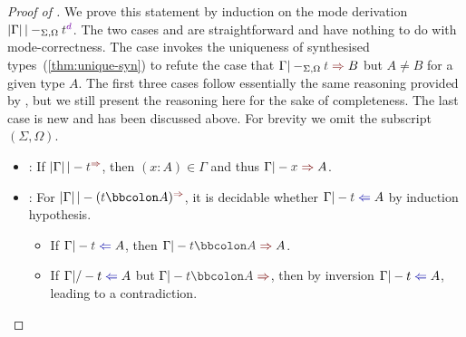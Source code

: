 \begin{proof}[Proof of {}]
  We prove this statement by induction on the mode derivation\/ $\erase{\Gamma} |-_{\Sigma, \Omega} \isTerm{t}^{\dir{d}}$.
  The two cases  and  are straightforward and have nothing to do with mode-correctness.
  The case  invokes the uniqueness of synthesised types~(\cref{thm:unique-syn}) to refute the case that $\Gamma |-_{\Sigma, \Omega} \isTerm{t} \syn B$ but $A \neq B$ for a given type $A$.
  The first three cases follow essentially the same reasoning provided by \citet{Wadler2022}, but we still present the reasoning here for the sake of completeness.
  The last case  is new and has been discussed above.
  For brevity we omit the subscript $(\Sigma, \Omega)$.
  \begin{itemize}
    \item {}: If $\erase{\Gamma} |- \isTerm{t}^{\syn}$, then $(x : A) \in \Gamma$ and thus $\Gamma |- \isTerm{x} \syn A$.

    \item {}: For $\erase{\Gamma} |- (\isTerm{t} \annotate A)^{\syn}$, it is decidable whether $\Gamma |- \isTerm{t} \chk A$ by induction hypothesis.
      \begin{itemize}
        \item If $\Gamma |- \isTerm{t} \chk A$, then $\Gamma |- \isTerm{t \annotate A} \syn A$.
        \item If $\Gamma |/- t \chk A$ but $\Gamma |- \isTerm{t \annotate A} \syn$, then by inversion $\Gamma |- t \chk A$, leading to a contradiction.
      \end{itemize}
      

\end{itemize}
\end{proof}
